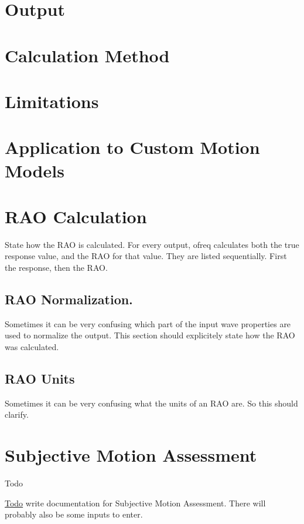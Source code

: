 \section*{Output}

\section*{Calculation Method}

\section*{Limitations}

\section*{Application to Custom Motion Models}

\section*{R\-A\-O Calculation}

State how the R\-A\-O is calculated. For every output, ofreq calculates both the true response value, and the R\-A\-O for that value. They are listed sequentially. First the response, then the R\-A\-O.

\subsection*{R\-A\-O Normalization.}

Sometimes it can be very confusing which part of the input wave properties are used to normalize the output. This section should explicitely state how the R\-A\-O was calculated.

\subsection*{R\-A\-O Units}

Sometimes it can be very confusing what the units of an R\-A\-O are. So this should clarify. \hypertarget{local_sma}{}\section{Subjective Motion Assessment}\label{local_sma}
\begin{DoxyRefDesc}{Todo}
\item[\hyperlink{todo__todo000022}{Todo}]write documentation for Subjective Motion Assessment. There will probably also be some inputs to enter.\end{DoxyRefDesc}


